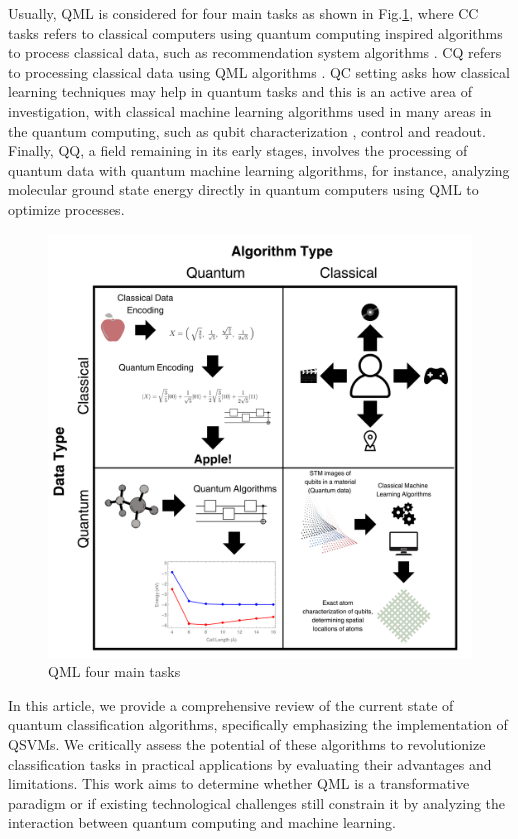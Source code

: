 \documentclass{article}
\begin{document}
Usually, QML is considered for four main tasks as shown in Fig.\ref{fig:qtasks}, where CC tasks refers to classical computers using quantum computing inspired algorithms to process classical data, such as recommendation system algorithms \cite{ccalg}. CQ refers to processing classical data using QML algorithms \cite{cq}. QC setting asks how classical learning techniques may
help in quantum tasks and this is an active area of investigation, with classical machine learning algorithms used in many areas in the quantum computing, such as qubit characterization \cite{charqc}, control \cite{controlqc} and readout\cite{readoutqc}. Finally, QQ, a field remaining in its early stages, involves the processing of quantum data with quantum machine learning algorithms, for instance, analyzing molecular ground state energy directly in quantum computers using QML to optimize processes.
\begin{figure}[h!]
    \centering
    \includegraphics[scale=0.19]{figures/QMLtypes.png}
    \caption{QML four main tasks}
    \label{fig:qtasks}
\end{figure}

In this article, we provide a comprehensive review of the current state of quantum classification algorithms, specifically emphasizing the implementation of QSVMs. We critically assess the potential of these algorithms to revolutionize classification tasks in practical applications by evaluating their advantages and limitations. This work aims to determine whether QML is a transformative paradigm or if existing technological challenges still constrain it by analyzing the interaction between quantum computing and machine learning.
\end{document}
